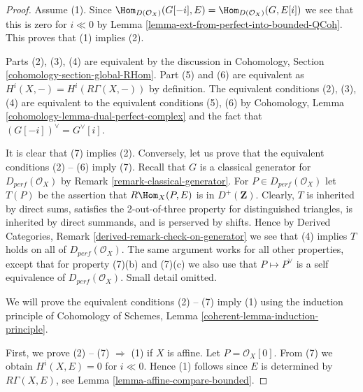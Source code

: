 \begin{proof}
Assume (1). Since
$\Hom_{D(\mathcal{O}_X)}(G[-i], E) = \Hom_{D(\mathcal{O}_X)}(G, E[i])$
we see that this is zero for $i \ll 0$ by
Lemma \ref{lemma-ext-from-perfect-into-bounded-QCoh}. This proves
that (1) implies (2).

\medskip\noindent
Parts (2), (3), (4) are equivalent by the discussion in
Cohomology, Section \ref{cohomology-section-global-RHom}.
Part (5) and (6) are equivalent as $H^i(X, -) = H^i(R\Gamma(X, -))$
by definition. The equivalent conditions (2), (3), (4) are
equivalent to the equivalent conditions (5), (6) by
Cohomology, Lemma \ref{cohomology-lemma-dual-perfect-complex}
and the fact that $(G[-i])^\vee = G^\vee[i]$.

\medskip\noindent
It is clear that (7) implies (2). Conversely, 
let us prove that the equivalent conditions (2) -- (6) imply (7).
Recall that $G$ is a  classical generator for $D_{perf}(\mathcal{O}_X)$ by
Remark \ref{remark-classical-generator}.
For $P \in D_{perf}(\mathcal{O}_X)$ let $T(P)$ be the assertion that
$R\Hom_X(P, E)$ is in $D^+(\mathbf{Z})$.
Clearly, $T$ is inherited by direct sums,
satisfies the 2-out-of-three property for distinguished
triangles, is inherited by direct summands, and is perserved by shifts.
Hence by Derived Categories, Remark \ref{derived-remark-check-on-generator}
we see that (4) implies $T$ holds on all of $D_{perf}(\mathcal{O}_X)$.
The same argument works for all other properties, except that for property
(7)(b) and (7)(c) we also use that $P \mapsto P^\vee$ is a self
equivalence of $D_{perf}(\mathcal{O}_X)$. Small detail omitted.

\medskip\noindent
We will prove the equivalent conditions (2) -- (7) imply (1)
using the induction principle of
Cohomology of Schemes, Lemma \ref{coherent-lemma-induction-principle}.

\medskip\noindent
First, we prove (2) -- (7) $\Rightarrow$ (1) if $X$ is affine.
Let $P = \mathcal{O}_X[0]$. From (7) we obtain $H^i (X, E) = 0$
for $i \ll 0$. Hence (1) follows since $E$ is
determined by $R\Gamma (X, E)$, see Lemma \ref{lemma-affine-compare-bounded}.


\end{proof}
